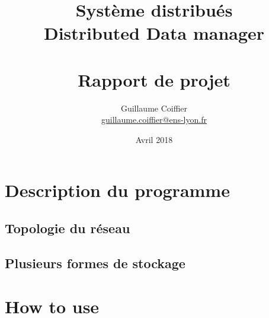 \documentclass[a4paper]{report}
\title{\Huge\bfseries Système distribués \\ Distributed Data manager \\~\\ \Large Rapport de projet}
\author{Guillaume Coiffier \\ \href{mailto:guillaume.coiffier@ens-lyon.fr}{guillaume.coiffier@ens-lyon.fr}}
\date{Avril 2018}
\begin{document}
\maketitle
\tableofcontents

\chapter{Description du programme}

\section{Topologie du réseau}

\section{Plusieurs formes de stockage}

\chapter{How to use}
\end{document}
